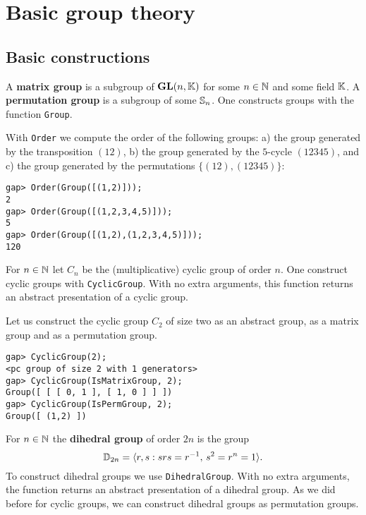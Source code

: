 \chapter{Basic group theory}


\section{Basic constructions}

A \textbf{matrix group} is a subgroup of $\mathbf{GL}(n,\mathbb{K})$ for some $n\in\mathbb{N}$ and some
field $\mathbb{K}$. A \textbf{permutation group} is a subgroup of some $\mathbb{S}_n$. One
constructs groups with the function \lstinline{Group}. 

\begin{example}
With \lstinline{Order} we compute the order of the following groups: a) the
group generated by the transposition $(12)$, b) the group generated by the
$5$-cycle $(12345)$, and c) the group generated by the permutations
$\{(12),(12345)\}$: 
\begin{lstlisting}
gap> Order(Group([(1,2)]));
2
gap> Order(Group([(1,2,3,4,5)]));
5
gap> Order(Group([(1,2),(1,2,3,4,5)]));
120
\end{lstlisting}
\end{example}

For $n\in\mathbb{N}$ let $C_n$ be the (multiplicative) cyclic group of order $n$. One
construct cyclic groups with \lstinline{CyclicGroup}. With no extra arguments,
this function returns an abstract presentation of a cyclic group. 

\begin{example}
Let us construct the cyclic group $C_2$ of size two as an abstract group, as a
matrix group and as a permutation group. 
\begin{lstlisting}
gap> CyclicGroup(2);
<pc group of size 2 with 1 generators>
gap> CyclicGroup(IsMatrixGroup, 2);
Group([ [ [ 0, 1 ], [ 1, 0 ] ] ])
gap> CyclicGroup(IsPermGroup, 2);
Group([ (1,2) ])
\end{lstlisting}
\end{example}

For $n\in\mathbb{N}$ the 
\textbf{dihedral group} of order $2n$ is the group 
\[
\mathbb{D}_{2n}=\langle r,s:srs=r^{-1},\,s^2=r^n=1\rangle.
\]
To construct dihedral groups we use \lstinline{DihedralGroup}.  With no extra
arguments, the function returns an abstract presentation of a dihedral group.
As we did before for cyclic groups, we can construct dihedral groups as
permutation groups. 


